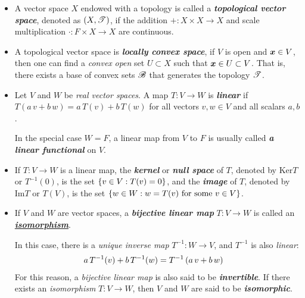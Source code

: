 \documentclass[11pt]{article}
\begin{document}
\begin{itemize}
\item \begin{definition} 
A vector space $X$ endowed with a topology is called a \emph{\textbf{topological vector space}}, denoted as $(X, {\mathscr T})$, if the addition $+: X\times X \rightarrow X$ and scale multiplication $\cdot: F \times X \rightarrow X$ are continuous. 
\end{definition}

\item  \begin{definition} 
A topological vector space is \emph{\textbf{locally convex space}}, if $V$ is open and $\boldsymbol{x}\in V$, then one can find a \emph{convex} \emph{open} set $U\subset X$ such that $\boldsymbol{x}\in U\subset V$. That is, there exists a base of convex sets ${\mathscr B}$ that generates the topology ${\mathscr T}$. 
\end{definition}

\item \begin{definition}
Let $V$ and $W$ be \emph{real vector spaces}. A map $T: V \rightarrow W$ is \emph{\textbf{linear}} if $T(a\,v + b\,w) = a\,T(v) + b\,T(w)$ for all vectors $v, w \in V$ and all scalars $a, b$.

In the special case $W = F$, a linear map from $V$ to $F$ is usually called \emph{\textbf{a linear functional}} on $V$.
\end{definition}

\item \begin{definition}
If $T: V \rightarrow W$ is a linear map, the \emph{\textbf{kernel}} or \emph{\textbf{null space}} of $T$, denoted by $\text{Ker}T$ or $T^{-1}(0)$, is the set $\left\{v \in V: T(v) = 0\right\}$, and the \emph{\textbf{image}} of $T$, denoted by $\text{Im}T$ or $T(V)$, is the set $\left\{w \in W: w = T(v) \text{ for some }v \in V \right\}$.
\end{definition}

\item \begin{definition}
If $V$ and $W$ are vector spaces, a \emph{\textbf{bijective linear map}} $T: V \rightarrow W$  is called an \underline{\emph{\textbf{isomorphism}}}. 

In this case, there is a \emph{unique inverse map} $T^{-1}: W \rightarrow V$, and $T^{-1}$ is also \emph{linear}:
\begin{align*}
a\,T^{-1}(v) + b\,T^{-1}(w) &= T^{-1}\left(a\,v + b\,w\right)
\end{align*} For this reason, a \emph{bijective linear map} is also said to be \emph{\textbf{invertible}}. If there exists an \emph{isomorphism} $T: V \rightarrow W$, then $V$ and $W$ are said to be \emph{\textbf{isomorphic}}.
\end{definition}
\end{itemize}
\end{document}
